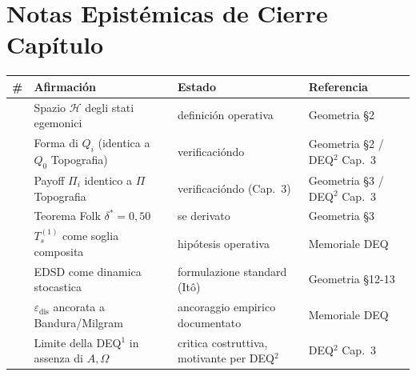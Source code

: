 \section{Notas Epistémicas de Cierre
Capítulo}\label{note-epistemiche-di-chiusura-capítulo}

{\def\LTcaptype{none} %
{\small\begin{longtable}[]{@{}
  >{\raggedright\arraybackslash}p{}
  >{\raggedright\arraybackslash}p{}
  >{\raggedright\arraybackslash}p{}
  >{\raggedright\arraybackslash}p{}@{}}
\toprule\noalign{}
\begin{minipage}[b]{\linewidth}\raggedright
\#
\end{minipage} & \begin{minipage}[b]{\linewidth}\raggedright
Afirmación
\end{minipage} & \begin{minipage}[b]{\linewidth}\raggedright
Estado
\end{minipage} & \begin{minipage}[b]{\linewidth}\raggedright
Referencia
\end{minipage} \\
\midrule\noalign{}
\endhead
\bottomrule\noalign{}
\endlastfoot
1 & Spazio \(\mathcal{H}\) degli stati egemonici & \Proved{} definición
operativa & Geometria \S{}2 \\
2 & Forma di \(Q_i\) (identica a \(Q_0\) Topografia) & \Proved{}
verificacióndo & Geometria \S{}2 / DEQ$^2$ Cap.~3 \\
3 & Payoff \(\Pi_i\) identico a $\Pi$ Topografia & \Proved{} verificacióndo
(Cap.~3) & Geometria \S{}3 / DEQ$^2$ Cap.~3 \\
4 & Teorema Folk \(\delta^* = 0{,}50\) & \Proved{} se derivato & Geometria
\S{}3 \\
5 & \(T_s^{(1)}\) come soglia composita & \Hypoth{} hipótesis operativa &
Memoriale DEQ \\
6 & EDSD come dinamica stocastica & \Proved{} formulazione standard
(Itô) & Geometria \S{}12-13 \\
7 & \(\varepsilon_{\text{dis}}\) ancorata a Bandura/Milgram & \Proved{}
ancoraggio empirico documentato & Memoriale DEQ \\
8 & Limite della DEQ$^1$ in assenza di \(A, \Omega\) & \Conj{} critica
costruttiva, motivante per DEQ$^2$ & DEQ$^2$ Cap.~3 \\
\end{longtable}}
}


